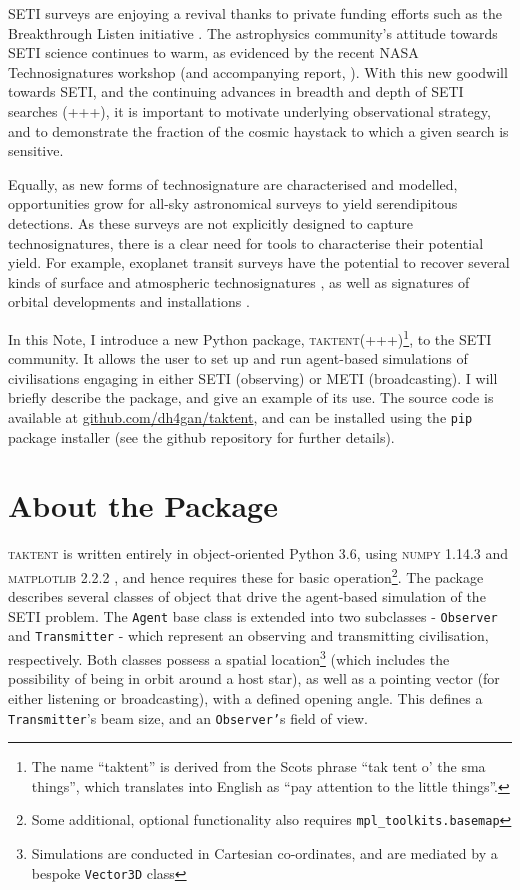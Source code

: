 \documentclass[RNAAS]{aastex62}
\begin{document}
SETI surveys are enjoying a revival thanks to private funding efforts such as the Breakthrough Listen initiative \citep{Isaacson2017}.  The astrophysics community's attitude towards SETI science continues to warm, as evidenced by the recent NASA Technosignatures workshop (and accompanying report, \citealt{Participants2018}).   With this new goodwill towards SETI, and the continuing advances in breadth and depth of SETI searches (+++), it is important to motivate underlying observational strategy, and to demonstrate the fraction of the cosmic haystack to which a given search is sensitive.  

Equally, as new forms of technosignature are characterised and modelled, opportunities grow for all-sky astronomical surveys to yield serendipitous detections.  As these surveys are not explicitly designed to capture technosignatures, there is a clear need for tools to characterise their potential yield.  For example, exoplanet transit surveys have the potential to recover several kinds of surface and atmospheric technosignatures \citep[e.g.][]{Lin2014,Korpela2015,Lingam2017a}, as well as signatures of orbital developments and installations \citep[e.g.][]{Socas-Navarro2018}.

In this Note, I introduce a new Python package, \textsc{taktent}(+++)\footnote{The name ``taktent'' is derived from the Scots phrase ``tak tent o' the sma things'', which translates into English as ``pay attention to the little things''.}, to the SETI community.  It allows the user to set up and run agent-based simulations of civilisations engaging in either SETI (observing) or METI (broadcasting).  I will briefly describe the package, and give an example of its use.  The source code is available at \url{github.com/dh4gan/taktent}, and can be installed using the \texttt{pip} package installer (see the github repository for further details).

\section{About the Package}

\noindent \textsc{taktent} is written entirely in object-oriented Python 3.6, using \textsc{numpy} 1.14.3 \citep{Oliphant2006} and \textsc{matplotlib} 2.2.2 \citep{Hunter2007}, and hence requires these for basic operation\footnote{Some additional, optional functionality also requires \texttt{mpl\_toolkits.basemap}}.  The package describes several classes of object that drive the agent-based simulation of the SETI problem.  The \texttt{Agent} base class is extended into two subclasses - \texttt{Observer} and \texttt{Transmitter} - which represent an observing and transmitting civilisation, respectively.  Both classes possess a spatial location\footnote{Simulations are conducted in Cartesian co-ordinates, and are mediated by a bespoke \texttt{Vector3D} class} (which includes the possibility of being in orbit around a host star), as well as a pointing vector (for either listening or broadcasting), with a defined opening angle.  This defines a \texttt{Transmitter}'s beam size, and an \texttt{Observer'}s field of view.
\end{document}
